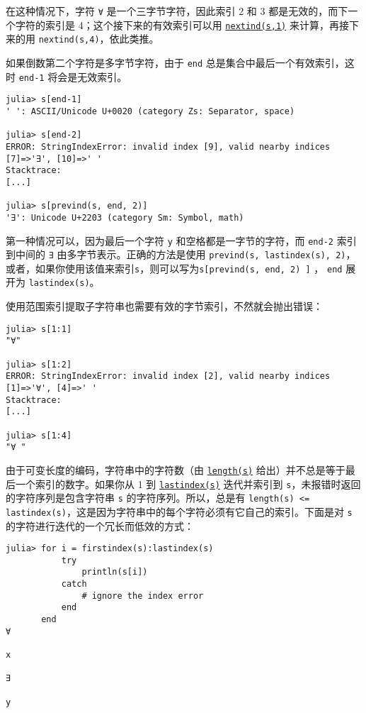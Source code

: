 在这种情况下，字符 \texttt{∀} 是一个三字节字符，因此索引 2 和 3 都是无效的，而下一个字符的索引是 4；这个接下来的有效索引可以用 \hyperlink{7455293228649070526}{\texttt{nextind(s,1)}} 来计算，再接下来的用 \texttt{nextind(s,4)}，依此类推。



如果倒数第二个字符是多字节字符，由于 \texttt{end} 总是集合中最后一个有效索引，这时 \texttt{end-1} 将会是无效索引。




\begin{verbatim}
julia> s[end-1]
' ': ASCII/Unicode U+0020 (category Zs: Separator, space)

julia> s[end-2]
ERROR: StringIndexError: invalid index [9], valid nearby indices [7]=>'∃', [10]=>' '
Stacktrace:
[...]

julia> s[prevind(s, end, 2)]
'∃': Unicode U+2203 (category Sm: Symbol, math)
\end{verbatim}



第一种情况可以，因为最后一个字符 \texttt{y} 和空格都是一字节的字符，而 \texttt{end-2} 索引到中间的 \texttt{∃} 由多字节表示。正确的方法是使用 \texttt{prevind(s, lastindex(s), 2)}，或者，如果你使用该值来索引\texttt{s}，则可以写为\texttt{s[prevind(s, end, 2) ]} ， \texttt{end} 展开为 \texttt{lastindex(s)}。



使用范围索引提取子字符串也需要有效的字节索引，不然就会抛出错误：  




\begin{verbatim}
julia> s[1:1]
"∀"

julia> s[1:2]
ERROR: StringIndexError: invalid index [2], valid nearby indices [1]=>'∀', [4]=>' '
Stacktrace:
[...]

julia> s[1:4]
"∀ "
\end{verbatim}



由于可变长度的编码，字符串中的字符数（由 \hyperlink{3699181304419743826}{\texttt{length(s)}} 给出）并不总是等于最后一个索引的数字。如果你从 1 到 \hyperlink{15780929618270241785}{\texttt{lastindex(s)}} 迭代并索引到 \texttt{s}，未报错时返回的字符序列是包含字符串 \texttt{s} 的字符序列。所以，总是有 \texttt{length(s) <= lastindex(s)}，这是因为字符串中的每个字符必须有它自己的索引。下面是对 \texttt{s} 的字符进行迭代的一个冗长而低效的方式：




\begin{verbatim}
julia> for i = firstindex(s):lastindex(s)
           try
               println(s[i])
           catch
               # ignore the index error
           end
       end
∀

x

∃

y
\end{verbatim}



